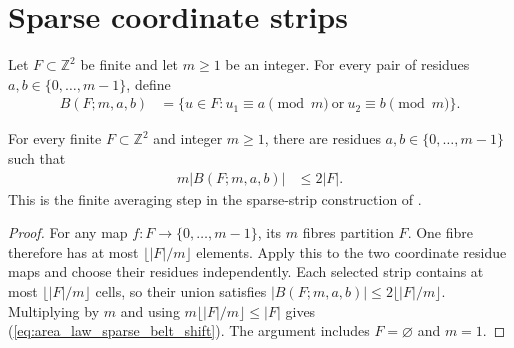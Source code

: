 \section{Sparse coordinate strips}
\label{sec:area_law_sparse_strips}

\begin{definition}
    \label{def:area_law_belt_cells}
    \leanok
    Let $F\subset\mathbb Z^2$ be finite and let $m\ge1$ be an integer.
    For every pair of residues $a,b\in\{0,\ldots,m-1\}$, define
    \begin{align}
        B(F;m,a,b) & =\{u\in F:u_1\equiv a\pmod m\ \text{or}\ u_2\equiv b\pmod m\}.
        \label{eq:area_law_residue_strips}
    \end{align}
\end{definition}

\begin{lemma}
    \label{thm:area_law_sparse_belt_shift}
    \leanok
    For every finite $F\subset\mathbb Z^2$ and integer $m\ge1$, there are
    residues $a,b\in\{0,\ldots,m-1\}$ such that
    \begin{align}
        m|B(F;m,a,b)| & \le2|F|.
        \label{eq:area_law_sparse_belt_shift}
    \end{align}
    This is the finite averaging step in the sparse-strip construction of
    \cite[Section~11]{OpenAI2026AreaLaw}.
\end{lemma}
\begin{proof}\leanok
    For any map $f:F\to\{0,\ldots,m-1\}$, its $m$ fibres partition $F$.
    One fibre therefore has at most $\lfloor|F|/m\rfloor$ elements.
    Apply this to the two coordinate residue maps and choose their
    residues independently. Each selected strip contains at most
    $\lfloor|F|/m\rfloor$ cells, so their union satisfies
    $|B(F;m,a,b)|\le2\lfloor|F|/m\rfloor$. Multiplying by $m$ and using
    $m\lfloor|F|/m\rfloor\le|F|$ gives
    (\ref{eq:area_law_sparse_belt_shift}). The argument includes $F=\varnothing$
    and $m=1$.
\end{proof}

